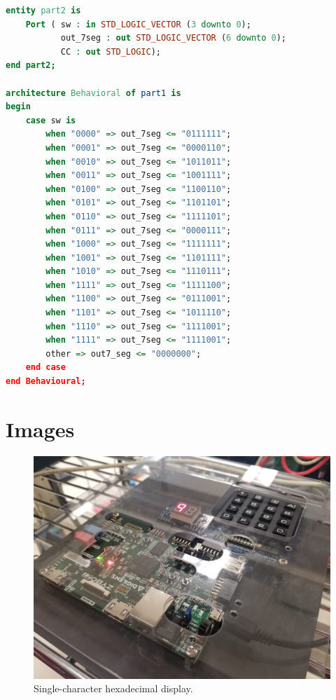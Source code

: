 \documentclass{article}
\begin{document}
\begin{appendices}
\begin{lstlisting}[language=VHDL]
entity part2 is
    Port ( sw : in STD_LOGIC_VECTOR (3 downto 0);
           out_7seg : out STD_LOGIC_VECTOR (6 downto 0);
           CC : out STD_LOGIC);
end part2;

architecture Behavioral of part1 is
begin
    case sw is
        when "0000" => out_7seg <= "0111111";
        when "0001" => out_7seg <= "0000110";
        when "0010" => out_7seg <= "1011011";
        when "0011" => out_7seg <= "1001111";
        when "0100" => out_7seg <= "1100110";
        when "0101" => out_7seg <= "1101101";
        when "0110" => out_7seg <= "1111101";
        when "0111" => out_7seg <= "0000111";
        when "1000" => out_7seg <= "1111111";
        when "1001" => out_7seg <= "1101111";
        when "1010" => out_7seg <= "1110111";
        when "1111" => out_7seg <= "1111100";
        when "1100" => out_7seg <= "0111001";
        when "1101" => out_7seg <= "1011110";
        when "1110" => out_7seg <= "1111001";
        when "1111" => out_7seg <= "1111001";
        other => out7_seg <= "0000000";
    end case
end Behavioural;
\end{lstlisting}

\section{Images}

    \begin{figure}[H]
	\centering
        \includegraphics[width=125mm]{display_single.jpg}
        \caption{Single-character hexadecimal display.}
        \label{fig:display_single}
    \end{figure}


\end{appendices}
\end{document}
